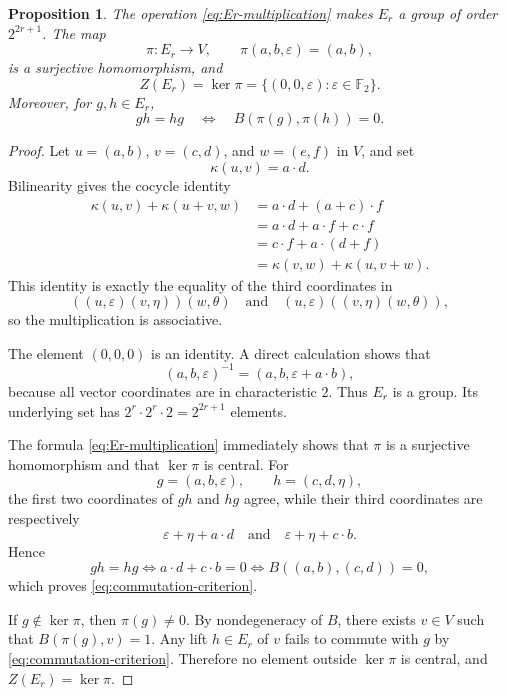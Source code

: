 \documentclass[11pt]{article}
\newtheorem{proposition}[theorem]{Proposition}
\theoremstyle{definition}
\newcommand{\F}{\mathbb{F}}
\begin{document}
\begin{proposition}\label{prop:Er-group}
The operation \eqref{eq:Er-multiplication} makes $E_r$ a group of order $2^{2r+1}$.  The map
\[
 \pi:E_r\longrightarrow V,
 \qquad
 \pi(a,b,\varepsilon)=(a,b),
\]
is a surjective homomorphism, and
\[
 Z(E_r)=\ker\pi=\{(0,0,\varepsilon):\varepsilon\in\F_2\}.
\]
Moreover, for $g,h\in E_r$,
\begin{equation}\label{eq:commutation-criterion}
 gh=hg
 \quad\Longleftrightarrow\quad
 B(\pi(g),\pi(h))=0.
\end{equation}
\end{proposition}

\begin{proof}
Let $u=(a,b)$, $v=(c,d)$, and $w=(e,f)$ in $V$, and set
\[
 \kappa(u,v)=a\cdot d.
\]
Bilinearity gives the cocycle identity
\begin{align*}
 \kappa(u,v)+\kappa(u+v,w)
 &=a\cdot d+(a+c)\cdot f\\
 &=a\cdot d+a\cdot f+c\cdot f\\
 &=c\cdot f+a\cdot(d+f)\\
 &=\kappa(v,w)+\kappa(u,v+w).
\end{align*}
This identity is exactly the equality of the third coordinates in
\[
 ((u,\varepsilon)(v,\eta))(w,\theta)
 \quad\text{and}\quad
 (u,\varepsilon)((v,\eta)(w,\theta)),
\]
so the multiplication is associative.

The element $(0,0,0)$ is an identity.  A direct calculation shows that
\[
 (a,b,\varepsilon)^{-1}=(a,b,\varepsilon+a\cdot b),
\]
because all vector coordinates are in characteristic $2$.  Thus $E_r$ is a group.  Its underlying set has $2^r\cdot2^r\cdot2=2^{2r+1}$ elements.

The formula \eqref{eq:Er-multiplication} immediately shows that $\pi$ is a surjective homomorphism and that $\ker\pi$ is central.  For
\[
 g=(a,b,\varepsilon),
 \qquad
 h=(c,d,\eta),
\]
the first two coordinates of $gh$ and $hg$ agree, while their third coordinates are respectively
\[
 \varepsilon+\eta+a\cdot d
 \quad\text{and}\quad
 \varepsilon+\eta+c\cdot b.
\]
Hence
\[
 gh=hg
 \iff a\cdot d+c\cdot b=0
 \iff B((a,b),(c,d))=0,
\]
which proves \eqref{eq:commutation-criterion}.

If $g\notin\ker\pi$, then $\pi(g)\ne0$.  By nondegeneracy of $B$, there exists $v\in V$ such that $B(\pi(g),v)=1$.  Any lift $h\in E_r$ of $v$ fails to commute with $g$ by \eqref{eq:commutation-criterion}.  Therefore no element outside $\ker\pi$ is central, and $Z(E_r)=\ker\pi$.
\end{proof}
\end{document}
